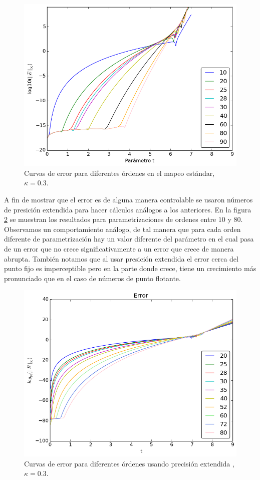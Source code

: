 \begin{figure}[H]
\centering
\includegraphics[scale=0.6]{error_estandar_orden}
\caption{Curvas de error para diferentes órdenes en el mapeo estándar, $\kappa=0.3$. }
\label{erroresf64}
\end{figure}
A fin de mostrar que el error es de alguna manera controlable se usaron números de presición extendida para hacer cálculos análogos a los anteriores. En la figura \ref{erroresBig} se muestran los resultados para parametrizaciones de ordenes entre $10$ y $80$. Observamos un comportamiento análogo, de tal manera que para cada orden diferente de parametrización hay un valor diferente del parámetro en el cual pasa de un error que no crece significativamente a un error que crece de manera abrupta. También notamos que al usar presición extendida el error cerca del punto fijo es imperceptible pero en la parte donde crece, tiene un crecimiento más pronunciado que en el caso de números de punto flotante. 

\begin{figure}[H]
\centering
\includegraphics[scale=0.6]{error_estandar_orden_big}
\caption{Curvas de error para diferentes órdenes usando precisión extendida ,$\kappa=0.3$. }
\label{erroresBig}
\end{figure}

